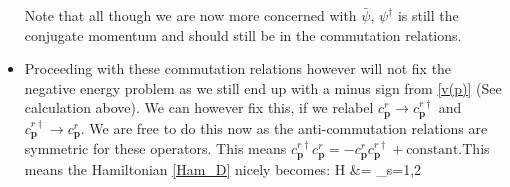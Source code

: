 \documentclass[11pt]{article}
\renewenvironment{flalign}{\vspace{-2mm}\empheq[box=\tcbhighmath]{align}}{\endempheq}
\numberwithin{equation}{section}
\begin{document}
\begin{itemize}
  Note that all though we are now more concerned with $\bar{\psi}$, $\psi^{\dagger}$ is still the conjugate momentum and should still be in the commutation relations.

\item Proceeding with these commutation relations however will not fix the negative energy problem as we still end up with a minus sign from \ref{v(p)} (See calculation above). We can however fix this, if we relabel $c^{r}_{\textbf{p}} \rightarrow c^{r\dagger}_{\textbf{p}}$ and $c^{r\dagger}_{\textbf{p}} \rightarrow c^{r}_{\textbf{p}}$. We are free to do this now as the anti-commutation relations are symmetric for these operators.  This means $c^{r\dagger}_{\textbf{p}}c^{r}_{\textbf{p}} = - c^{r}_{\textbf{p}}c^{r\dagger}_{\textbf{p}}  +\text{constant}$.This means the Hamiltonian \ref{Ham_D} nicely becomes: 
 \begin{flalign}
           H  &= \sum_{s=1,2}\int {}
  \end{flalign}  
\end{itemize}
\end{document}

